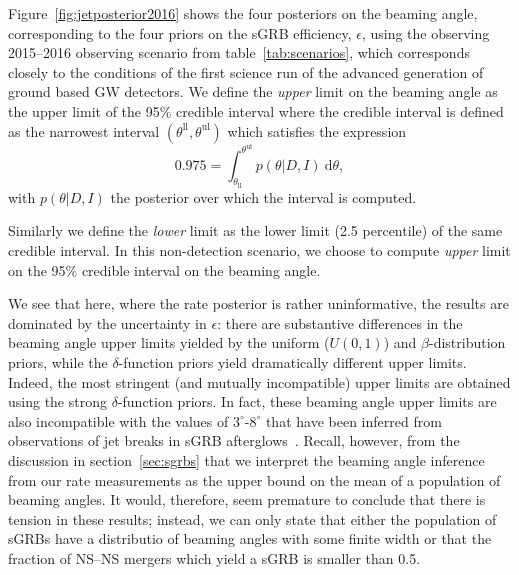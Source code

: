 \documentclass[twocolumn,nofootinbib]{revtex4-1}
\newcommand{\diff}{{\mathrm d}}
\newcommand{\BNS}{\ac{NS}--\ac{NS}\xspace}
\begin{document}

Figure~\ref{fig:jetposterior2016} shows the four posteriors on the
beaming angle, corresponding to the four priors on the \ac{sGRB}
efficiency, $\epsilon$, using the observing 2015--2016 observing
scenario from table~\ref{tab:scenarios}, which corresponds closely
to the conditions of the first science run of the advanced generation
of ground based \ac{GW} detectors.  We define the \emph{upper} limit
on the beaming angle as the upper limit of the 95\% credible interval
where the credible interval is defined as the narrowest interval
$(\theta^{\mathrm{ll}}, \theta^{\mathrm{ul}})$ which satisfies the expression
\begin{equation}
    \label{eq:beaming_upper_limit}
    0.975 = \int_{\theta_{\mathrm{ll}}}^{\theta^{\mathrm{ul}}} p(\theta|D,I)~\diff \theta,
\end{equation}
with $p(\theta|D,I)$ the posterior over which the interval is
computed.

Similarly we define the \emph{lower} limit as the lower
limit (2.5 percentile) of the same credible interval.  In this
non-detection scenario, we choose to compute \emph{upper} limit on the
95\% credible interval on the beaming angle.

We see that here, where the rate posterior is rather uninformative,
the results are dominated by the uncertainty in $\epsilon$: there are
substantive differences in the beaming angle upper limits yielded by
the uniform ($U(0,1)$) and $\beta$-distribution priors, while the
$\delta$-function priors yield dramatically different upper limits.
Indeed, the most stringent (and mutually incompatible) upper limits
are obtained using the strong $\delta$-function priors.  In fact,
these beaming angle upper limits are also incompatible with the values
of $3^{\circ}\mbox{-}8^{\circ}$ that have been inferred from
observations of jet breaks in \ac{sGRB}
afterglows~\cite{Fong:2013lba,2006MNRAS.367L..42P,
  2012A&A...538L...7N}.  Recall, however, from the discussion in
section~\ref{sec:sgrbs} that we interpret the beaming angle inference
from our rate measurements as the upper bound on the mean of a
population of beaming angles.  It would, therefore, seem premature to
conclude that there is tension in these results; instead, we can only
state that either the population of \acp{sGRB} have a distributio of
beaming angles with some finite width or that the fraction of \BNS
mergers which yield a \ac{sGRB} is smaller than 0.5.
\end{document}
